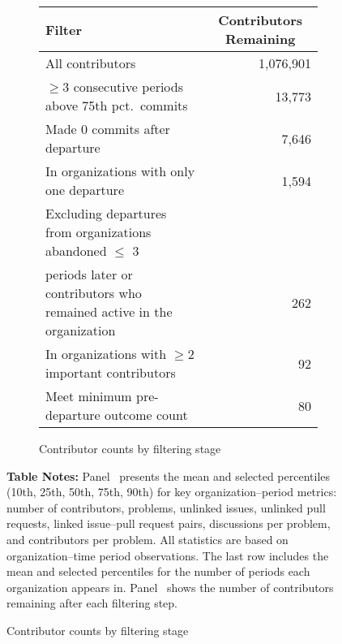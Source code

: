 \begin{figure}[ht]
  \begin{subfigure}[b]{0.9\textwidth}
\caption{Contributor counts by filtering stage} \label{fig:departed-summary-stats}
    \centering
    \small
    \begin{tabular}{@{}p{} r@{}}
      \toprule
      Filter & \multicolumn{1}{c}{Contributors Remaining} \\
      \midrule
      All contributors                                    & 1,076,901 \\
      $\ge 3$ consecutive periods above 75th pct.\ commits &   13,773   \\
      Made 0 commits after departure                      &    7,646   \\
      In organizations with only one departure                 &    1,594   \\
      Excluding departures from organizations abandoned  $\leq$ 3 \\ periods later or contributors who remained active in the organization &    262   \\
      In organizations with $\ge 2$ important contributors     &       92   \\
      Meet minimum pre-departure outcome count    &       80   \\
      \bottomrule
    \end{tabular}
  \end{subfigure}
    \bigskip
  \vspace{1ex}
  \begin{minipage}{\textwidth}
    \small
    \textbf{Table Notes:}
    Panel~ presents the mean and selected percentiles (10th, 25th, 50th, 75th, 90th) for key organization–period metrics: number of contributors, problems, unlinked issues, unlinked pull requests, linked issue–pull request pairs, discussions per problem, and contributors per problem. All statistics are based on organization–time period observations. The last row includes the mean and selected percentiles for the number of periods each organization appears in. 
    Panel~ shows the number of contributors remaining after each filtering step.
  \end{minipage}
\end{figure}
\pagebreak